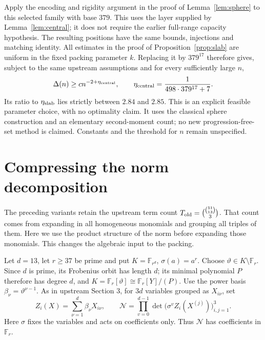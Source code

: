 \documentclass[11pt]{article}
\begin{document}
Apply the encoding and rigidity argument in the proof of
Lemma~\ref{lem:sphere} to this selected family with base \(379\).
This uses the layer supplied by Lemma~\ref{lem:central}; it does not
require the earlier full-range capacity hypothesis. The resulting
positions have the same bounds, injections and matching identity.
All estimates in the proof of Proposition~\ref{prop:slab} are uniform
in the fixed packing parameter \(k\). Replacing it by \(379^{17}\)
therefore gives, subject to the same upstream assumptions and for
every sufficiently large \(n\),
\[
 \Delta(n)\ge c n^{-2+\eta_{\rm central}},\qquad
 \eta_{\rm central}=\frac{1}{498\cdot379^{17}+7}.
\]
Its ratio to \(\eta_{\rm slab}\) lies strictly between \(2.84\) and
\(2.85\). This is an explicit feasible parameter choice, with no
optimality claim. It uses the classical sphere construction and an
elementary second-moment count; no new progression-free-set method
is claimed. Constants and the threshold for \(n\) remain unspecified.

\section{Compressing the norm decomposition}\label{sec:compression}
The preceding variants retain the upstream term count
\(T_{\rm old}=\binom{\binom{51}{13}}3\). That count comes from expanding
in all homogeneous monomials and grouping all triples of them.
Here we use the product structure of the norm before expanding those
monomials. This changes the algebraic input to the packing.

Let \(d=13\), let \(r\ge37\) be prime and put
\(K=\mathbb F_{r^d}\), \(\sigma(a)=a^r\).
Choose \(\vartheta\in K\setminus\mathbb F_r\). Since \(d\) is prime,
its Frobenius orbit has length \(d\); its minimal polynomial \(P\)
therefore has degree \(d\), and
\(K=\mathbb F_r[\vartheta]\cong\mathbb F_r[Y]/(P)\).
Use the power basis \(\beta_\nu=\vartheta^{\nu-1}\).
As in upstream Section 3, for \(3d\) variables grouped as \(X_{i\nu}\), set
\[
 Z_i(X)=\sum_{\nu=1}^d\beta_\nu X_{i\nu},\qquad
 \mathcal N=\prod_{v=0}^{d-1}
   \det\bigl(\sigma^v Z_i(X^{(j)})\bigr)_{i,j=1}^3.
\]
Here \(\sigma\) fixes the variables and acts on coefficients only.
Thus \(\mathcal N\) has coefficients in \(\mathbb F_r\).
\end{document}
